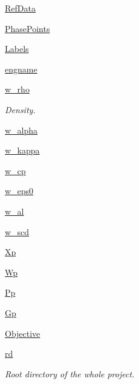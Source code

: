 \begin{DoxyCompactItemize}
\hyperlink{classforcebalance_1_1lipid_1_1Lipid_a68d0649454816e6f1eb121166ccc9e00}{Ref\-Data}
\item 
\hyperlink{classforcebalance_1_1lipid_1_1Lipid_a06402bf1c90229f6a585c7b97490a358}{Phase\-Points}
\item 
\hyperlink{classforcebalance_1_1lipid_1_1Lipid_a11762b444ea898e606b4fa1443f2340b}{Labels}
\item 
\hyperlink{classforcebalance_1_1lipid_1_1Lipid_a067ed652bb763a59b9fe86359d672cab}{engname}
\item 
\hyperlink{classforcebalance_1_1lipid_1_1Lipid_aeda7b6f1accd80386a1a50fdb90ff318}{w\-\_\-rho}
\begin{DoxyCompactList}\small\item\em Density. \end{DoxyCompactList}\item 
\hyperlink{classforcebalance_1_1lipid_1_1Lipid_ad945268a85a7e15086ceb5b3046a6f21}{w\-\_\-alpha}
\item 
\hyperlink{classforcebalance_1_1lipid_1_1Lipid_a3d7a1134b742778f6d5e4023b4d4a414}{w\-\_\-kappa}
\item 
\hyperlink{classforcebalance_1_1lipid_1_1Lipid_a5165cf9a6a12094842ff5f5962d725c2}{w\-\_\-cp}
\item 
\hyperlink{classforcebalance_1_1lipid_1_1Lipid_adf9666004923aa1672770b94d7cc8038}{w\-\_\-eps0}
\item 
\hyperlink{classforcebalance_1_1lipid_1_1Lipid_a204f491eb38e8a8570c74d7eaf3d940a}{w\-\_\-al}
\item 
\hyperlink{classforcebalance_1_1lipid_1_1Lipid_a6f9b743f37d3e891a9815b6bc1e1e475}{w\-\_\-scd}
\item 
\hyperlink{classforcebalance_1_1lipid_1_1Lipid_a56ebab6f8e310afff1b15786ac819eec}{Xp}
\item 
\hyperlink{classforcebalance_1_1lipid_1_1Lipid_aede087654d9ef2447e82692e1b2c65db}{Wp}
\item 
\hyperlink{classforcebalance_1_1lipid_1_1Lipid_aca96d65234d1e76d1fd601579025fe55}{Pp}
\item 
\hyperlink{classforcebalance_1_1lipid_1_1Lipid_a1fd3411f9d69e50655ac9d2b8de9fc2b}{Gp}
\item 
\hyperlink{classforcebalance_1_1lipid_1_1Lipid_a0ffb4377a0cfdf7572166bb6e8d5b130}{Objective}
\item 
\hyperlink{classforcebalance_1_1target_1_1Target_a4edb69fbde792e9f2f27e54b7c978c8e}{rd}
\begin{DoxyCompactList}\small\item\em Root directory of the whole project. \end{DoxyCompactList}\item 

\end{DoxyCompactItemize}
